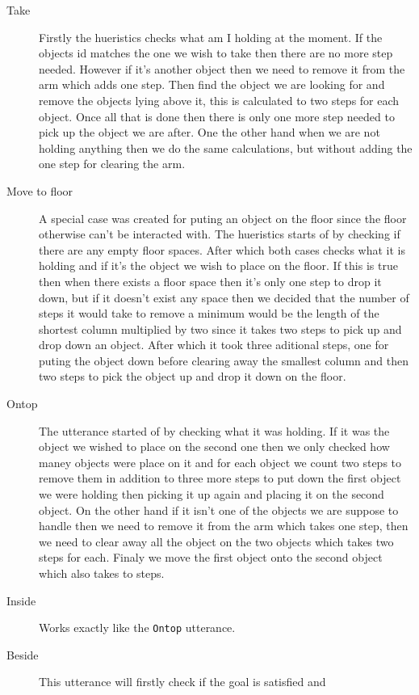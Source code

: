 \begin{description}
  \item[Take] Firstly the hueristics checks what am I holding at the moment. If
    the objects id matches the one we wish to take then there are no more step
    needed. However if it's another object then we need to remove it from the
    arm which adds one step. Then find the object we are looking for and remove
    the objects lying above it, this is calculated to two steps for each object.
    Once all that is done then there is only one more step needed to pick up the
    object we are after. One the other hand when we are not holding anything
    then we do the same calculations, but without adding the one step for
    clearing the arm.
  \item[Move to floor] A special case was created for puting an object on the
    floor since the floor otherwise can't be interacted with. The hueristics
    starts of by checking if there are any empty floor spaces. After which both
    cases checks what it is holding and if it's the object we wish to place on
    the floor. If this is true then when there exists a floor space then it's
    only one step to drop it down, but if it doesn't exist any space then we
    decided that the number of steps it would take to remove a minimum would be
    the length of the shortest column multiplied by two since it takes two steps
    to pick up and drop down an object. After which it took three aditional
    steps, one for puting the object down before clearing away the smallest
    column and then two steps to pick the object up and drop it down on the
    floor. 
  \item[Ontop] The utterance started of by checking what it was holding. If it
    was the object we wished to place on the second one then we only checked how
    maney objects were place on it and for each object we count two steps to
    remove them in addition to three more steps to put down the first object we
    were holding then picking it up again and placing it on the second object.
    On the other hand if it isn't one of the objects we are suppose to handle
    then we need to remove it from the arm which takes one step, then we need to
    clear away all the object on the two objects which takes two steps for each.
    Finaly we move the first object onto the second object which also takes to
    steps.
  \item[Inside] Works exactly like the \verb|Ontop| utterance.
  \item[Beside] This utterance will firstly check if the goal is satisfied and

\end{description}
